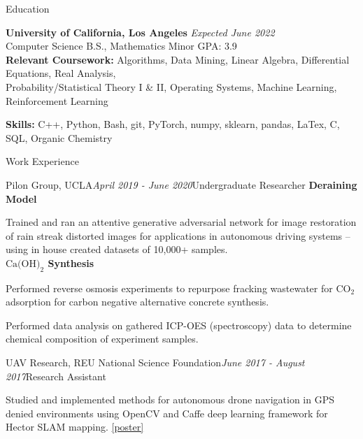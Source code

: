 \documentclass{resume}
\begin{document}
\begin{rSection}{Education}

{\bf University of California, Los Angeles} \hfill {\em Expected June 2022} 
\\ Computer Science B.S., Mathematics Minor \hfill {GPA: 3.9}\\
{\bf Relevant Coursework:} Algorithms, Data Mining, Linear Algebra, Differential Equations, Real Analysis,\\ Probability/Statistical Theory I \& II,
Operating Systems, Machine Learning, Reinforcement Learning
\end{rSection}

{\bf Skills:} C++, Python, Bash, git, PyTorch, numpy, sklearn, pandas, LaTex, C, SQL, Organic Chemistry


\begin{rSection}{Work Experience}
    \begin{rSubsection}{Pilon Group, UCLA}{\em April 2019 - June 2020}{Undergraduate Researcher}{}
        {\bf Deraining Model}
        \item Trained and ran an attentive generative adversarial network for image restoration of rain streak distorted
        images for applications in autonomous driving systems – using in house created datasets of 10,000+ samples.\\
        {\bf $\text{Ca}\text{(OH)}_{2}$ Synthesis}
        \item Performed reverse osmosis experiments to repurpose fracking wastewater for $\text{CO}_2$ adsorption 
        for carbon negative alternative concrete synthesis.
        \item Performed data analysis on gathered ICP-OES (spectroscopy) data to determine chemical composition of experiment samples.
    \end{rSubsection}
    \begin{rSubsection}{UAV Research, REU National Science Foundation}{\em June 2017 - August 2017}{Research Assistant}{}
        \item Studied and implemented methods for autonomous drone navigation in GPS denied environments using OpenCV and Caffe deep learning framework for Hector SLAM mapping.
        \href{https://docs.google.com/presentation/d/1fp-MPZUgKS_PhMD90d4aL0Rh0-YfghnEYHb3sHKmnGE/edit?usp=sharing}{[poster]}
    \end{rSubsection}
\end{rSection}
\end{document}
